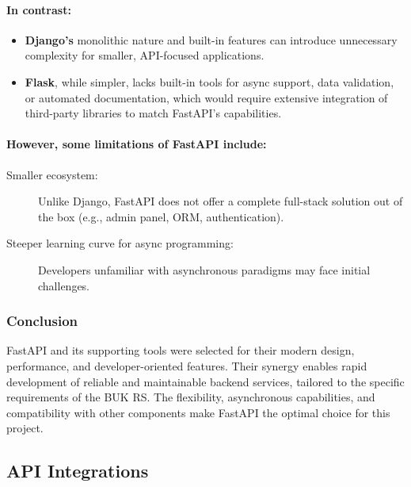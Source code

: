 \paragraph{In contrast:}

\begin{itemize}
  \item \textbf{Django’s} monolithic nature and built-in features can introduce unnecessary complexity for smaller, API-focused applications.
  \item \textbf{Flask}, while simpler, lacks built-in tools for async support, data validation, or automated documentation, which would require extensive integration of third-party libraries to match FastAPI’s capabilities.
\end{itemize}

\paragraph{However, some limitations of FastAPI include:}

\begin{description}
  \item[Smaller ecosystem:] Unlike Django, FastAPI does not offer a complete full-stack solution out of the box (e.g., admin panel, ORM, authentication).
  \item[Steeper learning curve for async programming:] Developers unfamiliar with asynchronous paradigms may face initial challenges.  
\end{description}

\subsubsection{Conclusion}

FastAPI and its supporting tools were selected for their modern design, performance, and developer-oriented features. Their synergy enables rapid development of reliable and maintainable backend services, tailored to the specific requirements of the BUK RS. The flexibility, asynchronous capabilities, and compatibility with other components make FastAPI the optimal choice for this project.

\subsection{API Integrations}

